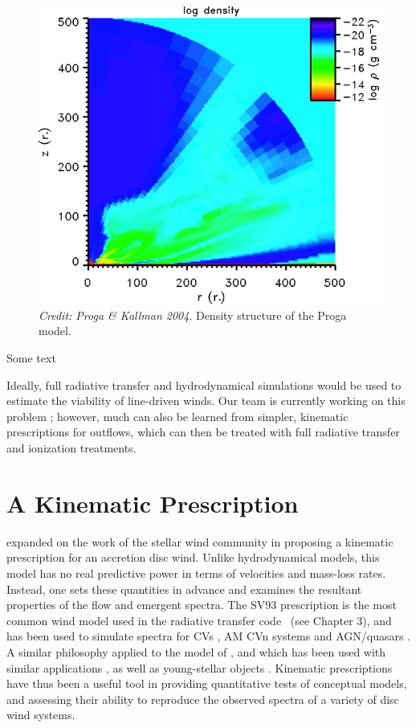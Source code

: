 \begin{figure}
\centering
\includegraphics[width=1.0\textwidth]{figures/02-outflows/proga.jpg}
\caption
{
{\sl Credit: Proga \& Kallman 2004}. 
Density structure of the Proga model.
} 
\label{fig:PK04}
\end{figure}

Some text


Ideally, full radiative transfer and hydrodynamical simulations would be used
to estimate the viability of line-driven winds. Our team is currently working 
on this problem \citep[see][for a first step]{H14}; however, much 
can also be learned from simpler, kinematic prescriptions for outflows, which
can then be treated with full radiative transfer and ionization treatments.  

\section{A Kinematic Prescription}

\citep[][hereafter SV93]{SV93} expanded on the work of the stellar wind community
\citep[e.g.][]{AL85} 
in proposing a kinematic prescription for an accretion disc wind. Unlike 
hydrodynamical models, this model has no real predictive power in terms of velocities
and mass-loss rates. Instead, one sets these quantities in advance and examines the 
resultant properties of the flow and emergent spectra. The SV93 prescription
is the most common wind model used in the radiative transfer code \py\ (see Chapter 3),
and has been used to simulate spectra for CVs \citep[][Chapter 5]{LK02, M15}, 
AM CVn systems \citep{kusterer2014} and AGN/quasars 
\citep[][Chapter 6]{higginbottom2013, M16, yong2016}. 
A similar philosophy applied to the model of \cite{KWD95}, and which has been used
with similar applications \citep{LK02, simlong2008, sim2010}, as 
well as young-stellar objects \citep[YSOs;][]{simmacro2005}.
Kinematic prescriptions have thus been a useful tool in providing quantitative
tests of conceptual models, and assessing their ability to reproduce
the observed spectra of a variety of disc wind systems.

